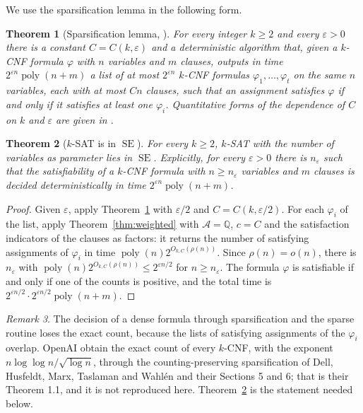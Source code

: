 \documentclass[11pt,reqno]{amsart}
\numberwithin{equation}{section}
\theoremstyle{plain}
\newtheorem{theorem}{Theorem}[section]
\theoremstyle{definition}
\theoremstyle{remark}
\newtheorem{remark}[theorem]{Remark}
\DeclareMathOperator{\poly}{poly}
\DeclareMathOperator{\SE}{SE}
\newcommand{\A}{\mathcal{A}}
\newcommand{\Q}{\mathbb{Q}}
\newcommand{\rhon}{\rho}
\newcommand{\oai}{OpenAI}
\begin{document}
We use the sparsification lemma in the following form.

\begin{theorem}[Sparsification lemma, \cite{IPZ01}]\label{thm:sparsification}
For every integer $k\ge2$ and every $\varepsilon>0$ there is a constant
$C=C(k,\varepsilon)$ and a deterministic algorithm that, given a $k$-CNF formula
$\varphi$ with $n$ variables and $m$ clauses, outputs in time
$2^{\varepsilon n}\poly(n+m)$ a list of at most $2^{\varepsilon n}$ $k$-CNF
formulas $\varphi_1,\dots,\varphi_t$ on the same $n$ variables, each with at most
$Cn$ clauses, such that an assignment satisfies $\varphi$ if and only if it
satisfies at least one $\varphi_i$. Quantitative forms of the dependence of $C$
on $k$ and $\varepsilon$ are given in \cite{CIP06}.
\end{theorem}

\begin{theorem}[$k$-SAT is in $\SE$]\label{thm:ksatse}
For every $k\ge2$, $k$-SAT with the number of variables as parameter lies in
$\SE$. Explicitly, for every $\varepsilon>0$ there is $n_\varepsilon$ such that
the satisfiability of a $k$-CNF formula with $n\ge n_\varepsilon$ variables and
$m$ clauses is decided deterministically in time $2^{\varepsilon n}\poly(n+m)$.
\end{theorem}

\begin{proof}
Given $\varepsilon$, apply Theorem~\ref{thm:sparsification} with
$\varepsilon/2$ and $C=C(k,\varepsilon/2)$. For each $\varphi_i$ of the list,
apply Theorem~\ref{thm:weighted} with $\A=\Q$, $c=C$ and the satisfaction
indicators of the clauses as factors: it returns the number of satisfying
assignments of $\varphi_i$ in time $\poly(n)2^{O_{k,C}(\rhon(n))}$. Since
$\rhon(n)=o(n)$, there is $n_\varepsilon$ with
$\poly(n)2^{O_{k,C}(\rhon(n))}\le2^{\varepsilon n/2}$ for $n\ge n_\varepsilon$.
The formula $\varphi$ is satisfiable if and only if one of the counts is
positive, and the total time is $2^{\varepsilon n/2}\cdot2^{\varepsilon n/2}\poly(n+m)$.
\end{proof}

\begin{remark}
The decision of a dense formula through sparsification and the sparse routine
loses the exact count, because the lists of satisfying assignments of the
$\varphi_i$ overlap. \oai{} obtain the exact count of every $k$-CNF, with the
exponent $n\log\log n/\sqrt{\log n}$, through the counting-preserving
sparsification of Dell, Husfeldt, Marx, Taslaman and Wahl\'en
\cite[Appendix A]{DHMTW14} and their Sections 5 and 6; that is their
Theorem 1.1, and it is not reproduced here. Theorem~\ref{thm:ksatse} is the
statement needed below.
\end{remark}
\end{document}
